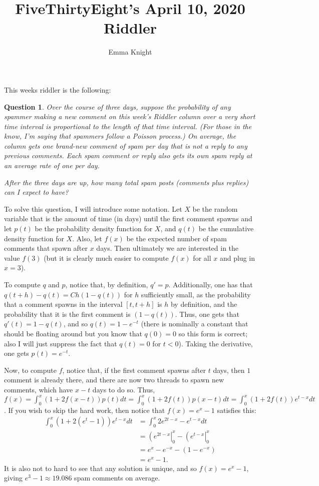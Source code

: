 \documentclass[11pt]{article}
\title{FiveThirtyEight's April 10, 2020 Riddler}
\author{Emma Knight}
\newtheorem{question}[theorem]{Question}
\theoremstyle{definition}
\begin{document}
\maketitle
This weeks riddler is the following:
\begin{question}
Over the course of three days, suppose the probability of any spammer making a new comment on this week's Riddler column over a very short time interval is proportional to the length of that time interval. (For those in the know, I'm saying that spammers follow a Poisson process.) On average, the column gets one brand-new comment of spam per day that is not a reply to any previous comments. Each spam comment or reply also gets its own spam reply at an average rate of one per day.

After the three days are up, how many total spam posts (comments plus replies) can I expect to have?
\end{question}

To solve this question, I will introduce some notation.  Let $X$ be the random variable that is the amount of time (in days) until the first comment spawns and let $p(t)$ be the probability density function for $X$, and $q(t)$ be the cumulative density function for $X$.  Also, let $f(x)$ be the expected number of spam comments that spawn after $x$ days.  Then ultimately we are interested in the value $f(3)$ (but it is clearly much easier to compute $f(x)$ for all $x$ and plug in $x = 3$).

To compute $q$ and $p$, notice that, by definition, $q' = p$.  Additionally, one has that $q(t+h) - q(t) = Ch(1-q(t))$ for $h$ sufficiently small, as the probability that a comment spawns in the interval $[t, t+h]$ is $h$ by definition, and the probability that it is the first comment is $(1-q(t))$.  Thus, one gets that $q'(t) = 1-q(t)$, and so $q(t) = 1 - e^{-t}$ (there is nominally a constant that should be floating around but you know that $q(0) = 0$ so this form is correct; also I will just suppress the fact that $q(t) = 0$ for $t < 0$).  Taking the derivative, one gets $p(t) = e^{-t}$.

Now, to compute $f$, notice that, if the first comment spawns after $t$ days, then $1$ comment is already there, and there are now two threads to spawn new comments, which have $x-t$ days to do so.  Thus, $f(x) = \int_0^x (1+2f(x-t))p(t)dt = \int_0^x (1+2f(t))p(x-t)dt = \int_0^x(1+2f(t))e^{t-x}dt$.  If you wish to skip the hard work, then notice that $f(x) = e^x - 1$ satisfies this:
\begin{align*}
\int_0^x(1+2(e^t - 1))e^{t-x}dt & = \int_0^x 2e^{2t-x} - e^{t-x} dt \\
& = \left(e^{2t-x}\right|_0^x - \left(e^{t-x}\right|_0^x \\
& = e^x - e^{-x} - (1 - e^{-x}) \\
& = e^x - 1.
\end{align*}
It is also not to hard to see that any solution is unique, and so $f(x) = e^x - 1$, giving $e^3 - 1 \approx 19.086$ spam comments on average.
\end{document}
